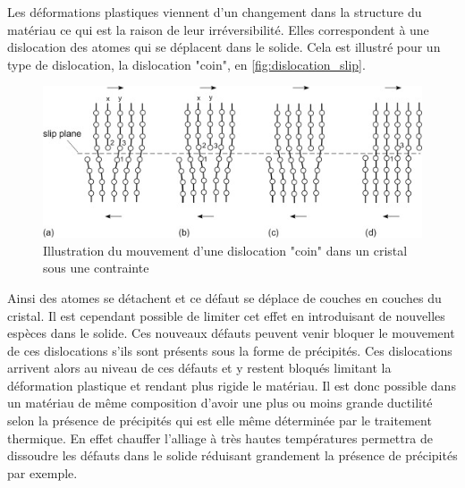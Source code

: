 Les déformations plastiques viennent d'un changement dans la structure du matériau ce qui est la raison de leur irréversibilité. Elles correspondent à une dislocation des atomes qui se déplacent dans le solide. Cela est illustré pour un type de dislocation, la dislocation "coin", en \autoref{fig:dislocation_slip}. 
\begin{figure}[h]
    \centering
    \includegraphics[width=0.8\linewidth]{figures/dislocations_slip.jpg}
    \caption{Illustration du mouvement d'une dislocation "coin" dans un cristal sous une contrainte \cite{manuel}}
    \label{fig:dislocation_slip}
\end{figure}
Ainsi des atomes se détachent et ce défaut se déplace de couches en couches du cristal. Il est cependant possible de limiter cet effet en introduisant de nouvelles espèces dans le solide. Ces nouveaux défauts peuvent venir bloquer le mouvement de ces dislocations s'ils sont présents sous la forme de précipités. Ces dislocations arrivent alors au niveau de ces défauts et y restent bloqués limitant la déformation plastique et rendant plus rigide le matériau. Il est donc possible dans un matériau de même composition d'avoir une plus ou moins grande ductilité selon la présence de précipités qui est elle même déterminée par le traitement thermique. En effet chauffer l'alliage à très hautes températures permettra de dissoudre les défauts dans le solide réduisant grandement la présence de précipités par exemple.
